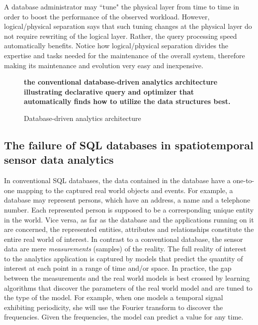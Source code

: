 A database administrator may ``tune" the physical layer from time to time in order to boost the performance of the observed workload. However, logical/physical separation says that such tuning changes at the physical layer do not require rewriting of the logical layer. Rather, the query processing speed automatically benefits. Notice how logical/physical separation divides the expertise and tasks needed for the maintenance of the overall system, therefore making its maintenance and evolution very easy and inexpensive.


\begin{figure}
{\bf the conventional database-driven analytics architecture illustrating declarative query and optimizer that automatically finds how to utilize the data structures best.}
\caption{Database-driven analytics architecture}
\label{fig:db-driven-arch}
\end{figure}

\subsection{The failure of SQL databases in spatiotemporal sensor data analytics}
\label{sec:the-failure}
In conventional SQL databases, the data contained in the database have a one-to-one mapping to the captured real world objects and events. For example, a database may represent persons, which have an address, a name and a telephone number. Each represented person is supposed to be a corresponding unique entity in the world. Vice versa, as far as the database and the applications running on it are concerned, the represented entities, attributes and relationships constitute the entire real world of interest. In contrast to a conventional database, the sensor data are mere {\em measurements} (samples) of the reality. The full reality of interest to the analytics application is captured by models that predict the quantity of interest at each point in a range of time and/or space. In practice, the gap between the measurements and the real world models is best crossed by learning algorithms that discover the parameters of the real world model and are tuned to the type of the model. For example, when one models a temporal signal exhibiting periodicity, she will use the Fourier transform to discover the frequencies. Given the frequencies, the model can predict a value for any time.

